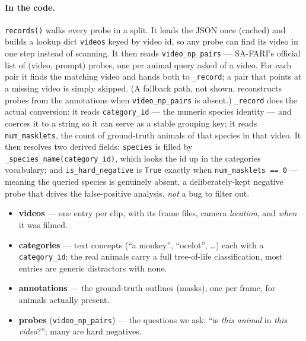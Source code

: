 \documentclass[11pt,a4paper]{article}
\newcommand{\code}[1]{\texttt{#1}}
\begin{document}
\paragraph{In the code.}
\code{records()} walks every probe in a split. It loads the JSON once (cached) and builds a lookup dict
\code{videos} keyed by video id, so any probe can find its video in one step instead of scanning. It then
reads \code{video\_np\_pairs} --- SA-FARI's official list of (video, prompt) probes, one per animal query
asked of a video. For each pair it finds the matching video and hands both to \code{\_record}; a pair that
points at a missing video is simply skipped. (A fallback path, not shown, reconstructs probes from the
annotations when \code{video\_np\_pairs} is absent.) \code{\_record} does the actual conversion: it reads
\code{category\_id} --- the numeric species identity --- and coerces it to a string so it can serve as a
stable grouping key; it reads \code{num\_masklets}, the count of ground-truth animals of that species in
that video. It then resolves two derived fields: \code{species} is filled by \code{\_species\_name(category\_id)},
which looks the id up in the categories vocabulary; and \code{is\_hard\_negative} is \code{True} exactly
when \code{num\_masklets == 0} --- meaning the queried species is genuinely absent, a deliberately-kept
negative probe that drives the false-positive analysis, \emph{not} a bug to filter out.

\begin{itemize}
  \item \textbf{videos} --- one entry per clip, with its frame files, camera \emph{location}, and \emph{when}
        it was filmed.
  \item \textbf{categories} --- text concepts (``a monkey'', ``ocelot'', \dots) each with a
        \code{category\_id}; the real animals carry a full tree-of-life classification, most entries are
        generic distractors with none.
  \item \textbf{annotations} --- the ground-truth outlines (masks), one per frame, for animals actually
        present.
  \item \textbf{probes} (\code{video\_np\_pairs}) --- the questions we ask: ``is \emph{this animal} in
        \emph{this video}?''; many are hard negatives.
\end{itemize}
\end{document}
